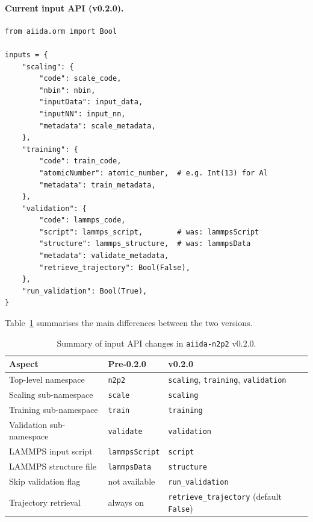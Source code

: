 \paragraph{Current input API (v0.2.0).}
\begin{lstlisting}
from aiida.orm import Bool

inputs = {
    "scaling": {
        "code": scale_code,
        "nbin": nbin,
        "inputData": input_data,
        "inputNN": input_nn,
        "metadata": scale_metadata,
    },
    "training": {
        "code": train_code,
        "atomicNumber": atomic_number,  # e.g. Int(13) for Al
        "metadata": train_metadata,
    },
    "validation": {
        "code": lammps_code,
        "script": lammps_script,        # was: lammpsScript
        "structure": lammps_structure,  # was: lammpsData
        "metadata": validate_metadata,
        "retrieve_trajectory": Bool(False),
    },
    "run_validation": Bool(True),
}
\end{lstlisting}

Table~\ref{tab:input-api-changes} summarises the main differences between the two
versions.

\begin{table}[htbp]
  \centering
  \caption{Summary of input API changes in \texttt{aiida-n2p2} v0.2.0.}
  \label{tab:input-api-changes}
  \begin{tabular}{lll}
    \toprule
    Aspect & Pre-0.2.0 & v0.2.0 \\
    \midrule
    Top-level namespace   & \texttt{n2p2}     & \texttt{scaling}, \texttt{training}, \texttt{validation} \\
    Scaling sub-namespace & \texttt{scale}    & \texttt{scaling} \\
    Training sub-namespace& \texttt{train}    & \texttt{training} \\
    Validation sub-namespace & \texttt{validate} & \texttt{validation} \\
    LAMMPS input script   & \texttt{lammpsScript} & \texttt{script} \\
    LAMMPS structure file & \texttt{lammpsData}   & \texttt{structure} \\
    Skip validation flag  & not available     & \texttt{run\_validation} \\
    Trajectory retrieval  & always on         & \texttt{retrieve\_trajectory} (default \texttt{False}) \\
    \bottomrule
  \end{tabular}
\end{table}

